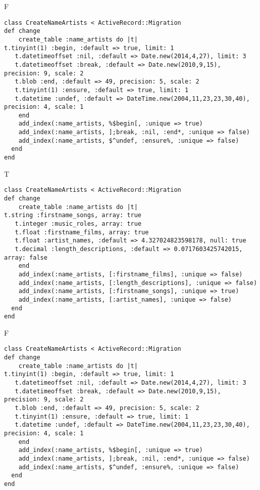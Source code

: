 F
\begin{verbatim}
class CreateNameArtists < ActiveRecord::Migration
def change
	create_table :name_artists do |t|
t.tinyint(1) :begin, :default => true, limit: 1
   t.datetimeoffset :nil, :default => Date.new(2014,4,27), limit: 3
   t.datetimeoffset :break, :default => Date.new(2010,9,15), precision: 9, scale: 2
   t.blob :end, :default => 49, precision: 5, scale: 2
   t.tinyint(1) :ensure, :default => true, limit: 1
   t.datetime :undef, :default => DateTime.new(2004,11,23,23,30,40), precision: 4, scale: 1
   	end
	add_index(:name_artists, %$begin[, :unique => true)
	add_index(:name_artists, ];break, :nil, :end*, :unique => false)
	add_index(:name_artists, $^undef, :ensure%, :unique => false)
  end 
end

\end{verbatim}

T
\begin{verbatim}
class CreateNameArtists < ActiveRecord::Migration
def change
	create_table :name_artists do |t|
t.string :firstname_songs, array: true
   t.integer :music_roles, array: true
   t.float :firstname_films, array: true
   t.float :artist_names, :default => 4.327024823598178, null: true
   t.decimal :length_descriptions, :default => 0.0717603425742015, array: false
   	end
	add_index(:name_artists, [:firstname_films], :unique => false)
	add_index(:name_artists, [:length_descriptions], :unique => false)
	add_index(:name_artists, [:firstname_songs], :unique => true)
	add_index(:name_artists, [:artist_names], :unique => false)
  end 
end

\end{verbatim}

F
\begin{verbatim}
class CreateNameArtists < ActiveRecord::Migration
def change
	create_table :name_artists do |t|
t.tinyint(1) :begin, :default => true, limit: 1
   t.datetimeoffset :nil, :default => Date.new(2014,4,27), limit: 3
   t.datetimeoffset :break, :default => Date.new(2010,9,15), precision: 9, scale: 2
   t.blob :end, :default => 49, precision: 5, scale: 2
   t.tinyint(1) :ensure, :default => true, limit: 1
   t.datetime :undef, :default => DateTime.new(2004,11,23,23,30,40), precision: 4, scale: 1
   	end
	add_index(:name_artists, %$begin[, :unique => true)
	add_index(:name_artists, ];break, :nil, :end*, :unique => false)
	add_index(:name_artists, $^undef, :ensure%, :unique => false)
  end 
end

\end{verbatim}

